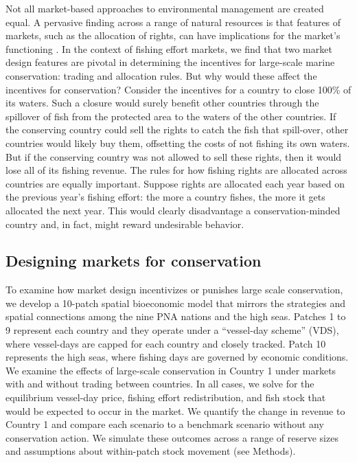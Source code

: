 \documentclass[12pt]{article}
\begin{document}
Not all market-based approaches to environmental management are created equal. A pervasive finding across a range of natural resources is that features of markets, such as the allocation of rights, can have implications for the market's functioning \cite{libecap_1989}. In the context of fishing effort markets, we find that two market design features are pivotal in determining the incentives for large-scale marine conservation: trading and allocation rules. But why would these affect the incentives for conservation? Consider the incentives for a country to close 100\% of its waters. Such a closure would surely benefit other countries through the spillover of fish from the protected area to the waters of the other countries. If the conserving country could sell the rights to catch the fish that spill-over, other countries would likely buy them, offsetting the costs of not fishing its own waters. But if the conserving country was not allowed to sell these rights, then it would lose all of its fishing revenue. The rules for how fishing rights are allocated across countries are equally important. Suppose rights are allocated each year based on the previous year's fishing effort: the more a country fishes, the more it gets allocated the next year. This would clearly disadvantage a conservation-minded country and, in fact, might reward undesirable behavior.

\subsection{Designing markets for conservation}

To examine how market design incentivizes or punishes large scale conservation, we develop a 10-patch spatial bioeconomic model that mirrors the strategies and spatial connections among the nine PNA nations and the high seas. Patches 1 to 9 represent each country and they operate under a ``vessel-day scheme'' (VDS), where vessel-days are capped for each country and closely tracked. Patch 10 represents the high seas, where fishing days are governed by economic conditions. We examine the effects of large-scale conservation in Country 1 under markets with and without trading between countries. In all cases, we solve for the equilibrium vessel-day price, fishing effort redistribution, and fish stock that would be expected to occur in the market. We quantify the change in revenue to Country 1 and compare each scenario to a benchmark scenario without any conservation action. We simulate these outcomes across a range of reserve sizes and assumptions about within-patch stock movement (see Methods).
\end{document}
